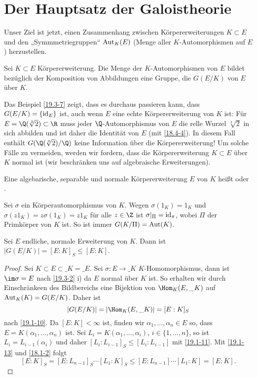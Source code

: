 \section{Der Hauptsatz der Galoistheorie}


Unser Ziel ist jetzt, einen Zusammenhang zwischen Körpererweiterungen $K \subset E$ und den „Symmmetriegruppen“ $\operatorname{Aut}_K(E)$ (Menge aller $K$-Automorphismen auf $E$) herzustellen.

\begin{df} \label{19.4-1}
	Sei $K \subset E$ Körpererweiterung.
	Die Menge der $K$-Automorphismen von $E$ bildet bezüglich der Komposition von Abbildungen eine Gruppe, die  $G(E/K)$ von $E$ über $K$.
\end{df}

Das Beispiel \ref{19.3-7} zeigt, dass es durchaus passieren kann, dass $G(E/K) = \{ \operatorname{id}_E \}$ ist, auch wenn $E$ eine echte Körpererweiterung von $K$ ist:
Für $E = \Q(\sqrt[3]{2}) \subset \R$ muss jeder $\Q$-Automorphismus von $E$ die relle Wurzel $\sqrt[3]{2}$ in sich abbilden und ist daher die Identität von $E$ (mit \ref{18.4-4}).
In diesem Fall enthält $G(\Q(\sqrt[3]{2})/\Q)$ keine Information über die Körpererweiterung!
Um solche Fälle zu vermeiden, werden wir fordern, dass die Körpererweiterung $K \subset E$ über $K$ normal ist (wir beschränken uns auf algebraische Erweiterungen).

\begin{df} \label{19.4-2}
	Eine algebarische, separable und normale Körpererweiterung $E$ von $K$ heißt  oder .
\end{df}

\begin{nt} \label{19.4-3}
	Sei $\sigma$ ein Körperautomorphismus von $K$.
	Wegen $\sigma(1_K) = 1_K$ und $\sigma(z 1_K) = z \sigma(1_K) = z 1_K$ für alle $z \in \Z$ ist $\sigma|_\Pi = \operatorname{id}_\pi$, wobei $\Pi$ der Primkörper von $K$ ist.
	So ist immer $G(K / \Pi) = \operatorname{Aut}(K)$.
\end{nt}

\begin{st} \label{19.4-4}
	Sei $E$ endliche, normale Erweiterung von $K$.
	Dann ist $|G(E/K)| = [E:K]_S \le [E:K]$.
	\begin{proof}
		Sei $K \subset E \subset \_K = \_E$.
		Sei $\sigma: E \to \_K$ $K$-Homomorphismus, dann ist $\im \sigma = E$ nach \ref{19.3-2} i) da $E$ normal über $K$ ist.
		So erhalten wir durch Einschränkeen des Bildbereichs eine Bijektion von $\Hom_K(E, \_K)$ auf $\operatorname{Aut}_K(K) = G(E/K)$.
		Daher ist
		\[
			|G(E / K)| = | \Hom_K(E, \_K)| = [E : K]_S
		\]
		nach \ref{19.1-10}.
		Da $[E : K] < \infty$ ist, finden wir $\alpha_1, \dotsc, \alpha_n \in E$ so, dass $E = K(\alpha_1, \dotsc, \alpha_n)$ ist.
		Sei $L_i = K(\alpha_1, \dotsc, \alpha_i)$, $i \in \{1, \dotsc, n\}$, so ist $L_i = L_{i-1}(\alpha_i)$ und daher $[L_i : L_{i-1}]_S \le [L_i : L_{i-1}]$ mit \ref{19.1-11}.
		Mit \ref{19.1-13} und \ref{18.1-2} folgt
		\[
			[E:K]_S = [E : L_{n-1}]_S \dotsb [L_1 : K]_S
			\le [E : L_{n-1}] \dotsb [L_1 : K]
			= [E : K].
		\]
	\end{proof}
\end{st}

